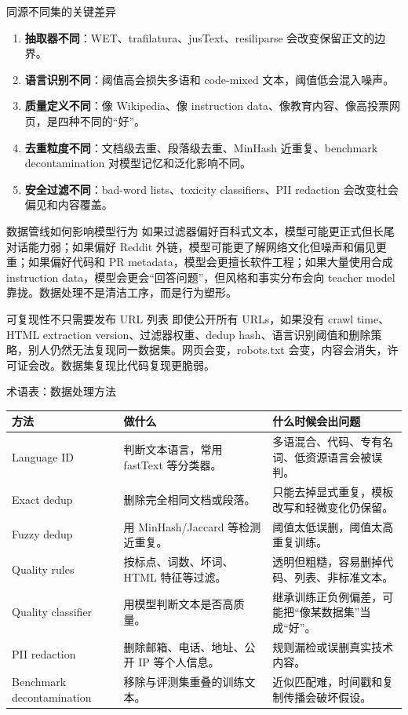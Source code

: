 \documentclass[a4paper]{article}
\begin{document}
\begin{importantbox}{同源不同集的关键差异}
\begin{enumerate}
    \item \textbf{抽取器不同}：WET、trafilatura、jusText、resiliparse 会改变保留正文的边界。
    \item \textbf{语言识别不同}：阈值高会损失多语和 code-mixed 文本，阈值低会混入噪声。
    \item \textbf{质量定义不同}：像 Wikipedia、像 instruction data、像教育内容、像高投票网页，是四种不同的“好”。
    \item \textbf{去重粒度不同}：文档级去重、段落级去重、MinHash 近重复、benchmark decontamination 对模型记忆和泛化影响不同。
    \item \textbf{安全过滤不同}：bad-word lists、toxicity classifiers、PII redaction 会改变社会偏见和内容覆盖。
\end{enumerate}
\end{importantbox}

\begin{knowledgebox}{数据管线如何影响模型行为}
如果过滤器偏好百科式文本，模型可能更正式但长尾对话能力弱；如果偏好 Reddit 外链，模型可能更了解网络文化但噪声和偏见更重；如果偏好代码和 PR metadata，模型会更擅长软件工程；如果大量使用合成 instruction data，模型会更会“回答问题”，但风格和事实分布会向 teacher model 靠拢。数据处理不是清洁工序，而是行为塑形。
\end{knowledgebox}

\begin{warningbox}{可复现性不只需要发布 URL 列表}
即使公开所有 URLs，如果没有 crawl time、HTML extraction version、过滤器权重、dedup hash、语言识别阈值和删除策略，别人仍然无法复现同一数据集。网页会变，robots.txt 会变，内容会消失，许可证会改。数据集复现比代码复现更脆弱。
\end{warningbox}

\begin{knowledgebox}{术语表：数据处理方法}
\begin{longtable}{L{0.22\textwidth}L{0.34\textwidth}L{0.34\textwidth}}
\toprule
方法 & 做什么 & 什么时候会出问题 \\
\midrule
\endhead
Language ID & 判断文本语言，常用 fastText 等分类器。 & 多语混合、代码、专有名词、低资源语言会被误判。 \\
Exact dedup & 删除完全相同文档或段落。 & 只能去掉显式重复，模板改写和轻微变化仍保留。 \\
Fuzzy dedup & 用 MinHash/Jaccard 等检测近重复。 & 阈值太低误删，阈值太高重复训练。 \\
Quality rules & 按标点、词数、坏词、HTML 特征等过滤。 & 透明但粗糙，容易删掉代码、列表、非标准文本。 \\
Quality classifier & 用模型判断文本是否高质量。 & 继承训练正负例偏差，可能把“像某数据集”当成“好”。 \\
PII redaction & 删除邮箱、电话、地址、公开 IP 等个人信息。 & 规则漏检或误删真实技术内容。 \\
Benchmark decontamination & 移除与评测集重叠的训练文本。 & 近似匹配难，时间戳和复制传播会破坏假设。 \\
\bottomrule
\end{longtable}
\end{knowledgebox}
\end{document}
